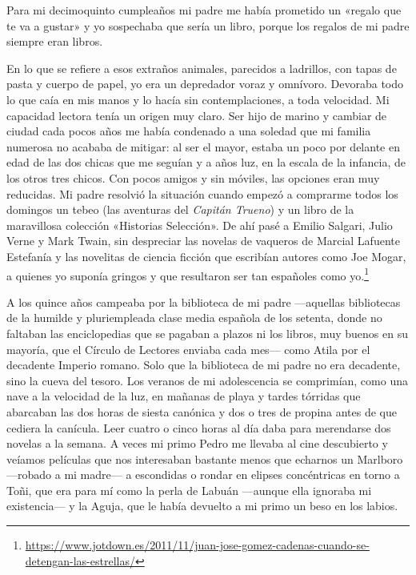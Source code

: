 

Para mi decimoquinto cumpleaños mi padre me había prometido un «regalo que te va a gustar» y yo sospechaba que sería un libro, porque los regalos de mi padre siempre eran libros.

En lo que se refiere a esos extraños animales, parecidos a ladrillos, con tapas de pasta y cuerpo de papel, yo era un depredador voraz y omnívoro. Devoraba todo lo que caía en mis manos y lo hacía sin contemplaciones, a toda velocidad. Mi capacidad lectora tenía un origen muy claro. Ser hijo de marino y cambiar de ciudad cada pocos años me había condenado a una soledad que mi familia numerosa no acababa de mitigar: al ser el mayor, estaba un poco por delante en edad de las dos chicas que me seguían y a años luz, en la escala de la infancia, de los otros tres chicos. Con pocos amigos y sin móviles, las opciones eran muy reducidas. Mi padre resolvió la situación cuando empezó a comprarme todos los domingos un tebeo (las aventuras del \emph{Capitán Trueno}) y un libro de la maravillosa colección «Historias Selección». De ahí pasé a Emilio Salgari, Julio Verne y Mark Twain, sin despreciar las novelas de vaqueros de Marcial Lafuente Estefanía y las novelitas de ciencia ficción que escribían autores como Joe Mogar, a quienes yo suponía gringos y que resultaron ser tan españoles como yo.\footnote{\url{https://www.jotdown.es/2011/11/juan-jose-gomez-cadenas-cuando-se-detengan-las-estrellas/}}

A los quince años campeaba por la biblioteca de mi padre ---aquellas bibliotecas de la humilde y pluriempleada clase media española de los setenta, donde no faltaban las enciclopedias que se pagaban a plazos ni los libros, muy buenos en su mayoría, que el Círculo de Lectores enviaba cada mes--- como Atila por el decadente Imperio romano. Solo que la biblioteca de mi padre no era decadente, sino la cueva del tesoro. Los veranos de mi adolescencia se comprimían, como una nave a la velocidad de la luz, en mañanas de playa y tardes tórridas que abarcaban las dos horas de siesta canónica y dos o tres de propina antes de que cediera la canícula. Leer cuatro o cinco horas al día daba para merendarse dos novelas a la semana. A veces mi primo Pedro me llevaba al cine descubierto y veíamos películas que nos interesaban bastante menos que echarnos un Marlboro ---robado a mi madre--- a escondidas o rondar en elipses concéntricas en torno a Toñi, que era para mí como la perla de Labuán ---aunque ella ignoraba mi existencia--- y la Aguja, que le había devuelto a mi primo un beso en los labios.

